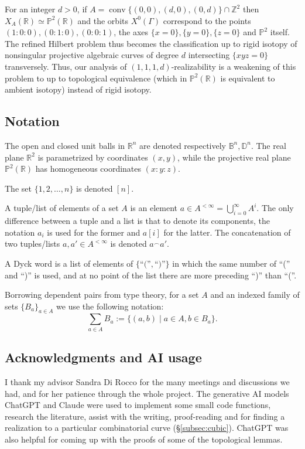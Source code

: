 \documentclass[11pt,reqno]{amsart}
\theoremstyle{plain}
\theoremstyle{definition}
\theoremstyle{remark}
\numberwithin{equation}{subsection}
\newcommand*{\bbB}{\mathbb{B}}
\newcommand*{\bbD}{\mathbb{D}}
\newcommand*{\bbP}{\mathbb{P}}
\newcommand*{\bbR}{\mathbb{R}}
\newcommand*{\bbZ}{\mathbb{Z}}
\DeclareMathOperator{\conv}{conv}
\begin{document}
For an integer $d>0$, if $A=\conv\{(0,0),(d,0),(0,d)\}\cap\bbZ^2$ then $X_A(\bbR)\simeq\bbP^2(\bbR)$ and the orbits $X^0(\Gamma)$ correspond to the points $(1:0:0),(0:1:0),(0:0:1)$, the axes $\{x=0\},\{y=0\},\{z=0\}$ and $\bbP^2$ itself. The refined Hilbert problem thus becomes the classification up to rigid isotopy of nonsingular projective algebraic curves of degree $d$ intersecting $\{xyz=0\}$ transversely. Thus, our analysis of $(1,1,1,d)$-realizability is a weakening of this problem to up to topological equivalence (which in $\bbP^2(\bbR)$ is equivalent to ambient isotopy) instead of rigid isotopy.

\subsection{Notation}
    The open and closed unit balls in $\bbR^n$ are denoted respectively $\bbB^n,\bbD^n$. The real plane $\bbR^2$ is parametrized by coordinates $(x,y)$, while the projective real plane $\bbP^2(\bbR)$ has homogeneous coordinates $(x:y:z)$.

    The set $\{1,2,\dots,n\}$ is denoted $[n]$.

    A tuple/list of elements of a set $A$ is an element $a\in A^{<\infty}=\bigcup_{i=0}^\infty A^i$. The only difference between a tuple and a list is that to denote its components, the notation $a_i$ is used for the former and $a[i]$ for the latter. The concatenation of two tuples/lists $a,a'\in A^{<\infty}$ is denoted $a^\frown a'$.

    A Dyck word is a list of elements of $\{\text{``(''},\text{``)''}\}$ in which the same number of ``('' and ``)'' is used, and at no point of the list there are more preceding ``)'' than ``(''.

    Borrowing dependent pairs from type theory, for a set $A$ and an indexed family of sets $\{B_a\}_{a\in A}$ we use the following notation:
    \[\sum_{a\in A}B_a:=\{(a,b)\mid a\in A,b\in B_a\}.\]

\subsection{Acknowledgments and AI usage}
I thank my advisor Sandra Di Rocco for the many meetings and discussions we had, and for her patience through the whole project. The generative AI models ChatGPT and Claude were used to implement some small code functions, research the literature, assist with the writing, proof-reading and for finding a realization to a particular combinatorial curve (§\ref{subsec:cubic}). ChatGPT was also helpful for coming up with the proofs of some of the topological lemmas.
\end{document}
